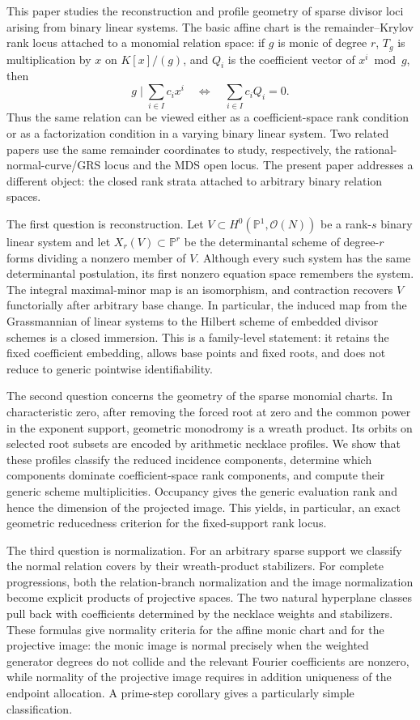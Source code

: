 \documentclass[10pt,fleqn]{article}
\numberwithin{equation}{section}
\newcommand{\PP}{\mathbb P}
\begin{document}
This paper studies the reconstruction and profile geometry of sparse divisor
loci arising from binary linear systems.  The basic affine chart is the
remainder--Krylov rank locus attached to a monomial relation space: if
\(g\) is monic of degree \(r\), \(T_g\) is multiplication by \(x\) on
\(K[x]/(g)\), and \(Q_i\) is the coefficient vector of \(x^i\bmod g\), then
\[
 g\mid \sum_{i\in I}c_i x^i
 \quad\Longleftrightarrow\quad
 \sum_{i\in I}c_iQ_i=0.
\]
Thus the same relation can be viewed either as a coefficient-space rank
condition or as a factorization condition in a varying binary linear system.
Two related papers \cite{LiYuanOrbits,LiYuanSchur} use the same remainder
coordinates to study, respectively, the rational-normal-curve/GRS locus and
the MDS open locus.  The present paper addresses a different object: the
closed rank strata attached to arbitrary binary relation spaces.

The first question is reconstruction.  Let \(V\subset H^0(\PP^1,\mathcal
O(N))\) be a rank-\(s\) binary linear system and let \(X_r(V)\subset\PP^r\)
be the determinantal scheme of degree-\(r\) forms dividing a nonzero member
of \(V\).  Although every such system has the same determinantal postulation,
its first nonzero equation space remembers the system.  The integral
maximal-minor map is an isomorphism, and contraction recovers \(V\)
functorially after arbitrary base change.  In particular, the induced map
from the Grassmannian of linear systems to the Hilbert scheme of embedded
divisor schemes is a closed immersion.  This is a family-level statement: it
retains the fixed coefficient embedding, allows base points and fixed roots,
and does not reduce to generic pointwise identifiability.

The second question concerns the geometry of the sparse monomial charts.  In
characteristic zero, after removing the forced root at zero and the common
power in the exponent support, geometric monodromy is a wreath product.  Its
orbits on selected root subsets are encoded by arithmetic necklace profiles.
We show that these profiles classify the reduced incidence components,
determine which components dominate coefficient-space rank components, and
compute their generic scheme multiplicities.  Occupancy gives the generic
evaluation rank and hence the dimension of the projected image.  This yields,
in particular, an exact geometric reducedness criterion for the fixed-support
rank locus.

The third question is normalization.  For an arbitrary sparse support we
classify the normal relation covers by their wreath-product stabilizers.  For
complete progressions, both the relation-branch normalization and the image
normalization become explicit products of projective spaces.  The two
natural hyperplane classes pull back with coefficients determined by the
necklace weights and stabilizers.  These formulas give normality criteria for the affine monic chart and for
the projective image: the monic image is normal precisely when the weighted
generator degrees do not collide and the relevant Fourier coefficients are
nonzero, while normality of the projective image requires in addition
uniqueness of the endpoint allocation.  A prime-step corollary gives a particularly simple classification.
\end{document}
